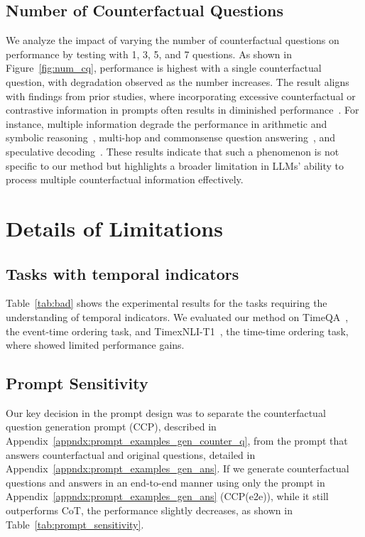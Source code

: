 \subsection{Number of Counterfactual Questions}
We analyze the impact of varying the number of counterfactual questions on performance by testing with 1, 3, 5, and 7 questions. As shown in Figure~\ref{fig:num_cq}, performance is highest with a single counterfactual question, with degradation observed as the number increases. The result aligns with findings from prior studies, where incorporating excessive counterfactual or contrastive information in prompts often results in diminished performance~\cite{yao2024largelanguagemodelscontrastive,fang2024counterfactualdebatingpresetstances,storaï2024harphesitationawarereframingtransformer}. For instance, multiple information degrade the performance in arithmetic and symbolic reasoning~\cite{yao2024largelanguagemodelscontrastive}, multi-hop and commonsense question answering~\cite{fang2024counterfactualdebatingpresetstances}, and speculative decoding~\cite{storaï2024harphesitationawarereframingtransformer}. These results indicate that such a phenomenon is not specific to our method but highlights a broader limitation in LLMs' ability to process multiple counterfactual information effectively.




\section{Details of Limitations}

\subsection{Tasks with temporal indicators}
\label{appndx:detail_limitation_temporal_indicator}
Table~\ref{tab:bad} shows the experimental results for the tasks requiring the understanding of temporal indicators. We evaluated our method on TimeQA~\cite{chen2dataset}, the event-time ordering task, and TimexNLI-T1~\cite{thukral2021probing}, the time-time ordering task, where \ours showed limited performance gains.

\subsection{Prompt Sensitivity}
\label{appndx:detail_limitation_prompt_sensitivity}

Our key decision in the prompt design was to separate the counterfactual question generation prompt (CCP), described in Appendix~\ref{appndx:prompt_examples_gen_counter_q}, from the prompt that answers counterfactual and original questions, detailed in Appendix~\ref{appndx:prompt_examples_gen_ans}. If we generate counterfactual questions and answers in an end-to-end manner using only the prompt in Appendix~\ref{appndx:prompt_examples_gen_ans} (CCP(e2e)), while it still outperforms CoT, the performance slightly decreases, as shown in Table~\ref{tab:prompt_sensitivity}.


